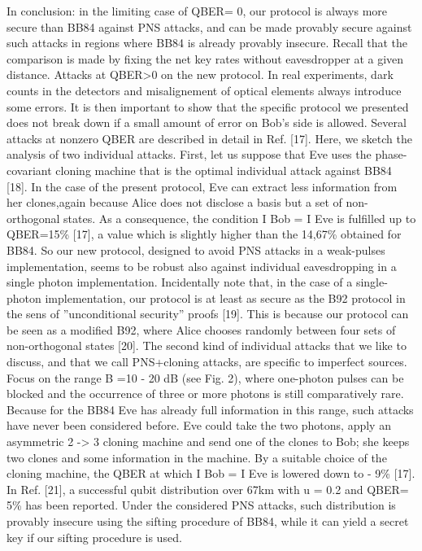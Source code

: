 In conclusion: in the limiting case of QBER= 0, our protocol is always more secure than BB84 against PNS attacks, and can be made provably secure against such attacks in regions where BB84 is already provably insecure. Recall that the comparison is made by fixing the net key rates without eavesdropper at a given distance.
Attacks at QBER>0 on the new protocol. In real experiments, dark counts in the detectors and misalignement of optical elements always introduce some errors.
It is then important to show that the specific protocol we presented does not break down if a small amount of error on Bob’s side is allowed. Several attacks at nonzero QBER are described in detail in Ref. [17]. Here, we sketch the analysis of two individual attacks.
First, let us suppose that Eve uses the phase-covariant cloning machine that is the optimal individual attack against BB84 [18]. In the case of the present protocol, Eve can extract less information from her clones,again because Alice does not disclose a basis but a set of non-orthogonal states. As a consequence, the condition I Bob = I Eve is fulfilled up to QBER=15\% [17], a value which is slightly higher than the 14,67\% obtained for BB84. So our new protocol, designed to avoid PNS attacks in a weak-pulses implementation, seems to be robust also against individual eavesdropping in a single photon implementation. Incidentally note that, in the case of a single-photon implementation, our protocol is at least as secure as the B92 protocol in the sens of ”unconditional security” proofs [19]. This is because our protocol can be seen as a modified B92, where Alice chooses randomly between four sets of non-orthogonal states [20].
The second kind of individual attacks that we like to discuss, and that we call PNS+cloning attacks, are specific to imperfect sources. Focus on the range B =10 - 20 dB (see Fig. 2), where one-photon pulses can be blocked and the occurrence of three or more photons is still comparatively rare. Because for the BB84 Eve has already full information in this range, such attacks have never been considered before. Eve could take the two photons, apply an asymmetric 2 -> 3 cloning machine and send one of the clones to Bob; she keeps two clones and some information in the machine. By a suitable choice of the cloning machine, the QBER at which I Bob = I Eve is lowered down to - 9\% [17]. In Ref. [21], a successful qubit distribution over 67km with u = 0.2 and QBER= 5\% has been reported. Under the considered PNS attacks, such distribution is provably insecure using the sifting procedure of BB84, while it can yield a secret key if our sifting procedure is used.

